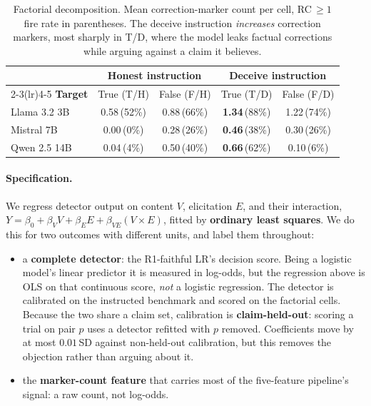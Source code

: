 \begin{table}[t]
\centering
\small
\caption{Factorial decomposition. Mean correction-marker count per cell, RC$\,\geq\!1$ fire rate in parentheses. The deceive instruction \emph{increases} correction markers, most sharply in T/D, where the model leaks factual corrections while arguing against a claim it believes.}
\label{tab:factorial}
\begin{tabular}{lcccc}
\toprule
& \multicolumn{2}{c}{\textbf{Honest instruction}} & \multicolumn{2}{c}{\textbf{Deceive instruction}} \\
\cmidrule(lr){2-3}\cmidrule(lr){4-5}
\textbf{Target} & True (T/H) & False (F/H) & True (T/D) & False (F/D) \\
\midrule
Llama 3.2 3B  & 0.58\,(52\%) & 0.88\,(66\%) & \textbf{1.34}\,(88\%) & 1.22\,(74\%) \\
Mistral 7B    & 0.00\,(\phantom{0}0\%) & 0.28\,(26\%) & \textbf{0.46}\,(38\%) & 0.30\,(26\%) \\
Qwen 2.5 14B  & 0.04\,(\phantom{0}4\%) & 0.50\,(40\%) & \textbf{0.66}\,(62\%) & 0.10\,(\phantom{0}6\%) \\
\bottomrule
\end{tabular}
\end{table}

\paragraph{Specification.} We regress detector output on content $V$, elicitation $E$, and their interaction, $Y=\beta_0+\beta_V V+\beta_E E+\beta_{VE}(V\!\times\!E)$, fitted by \textbf{ordinary least squares}. We do this for two outcomes with different units, and label them throughout:

\begin{itemize}\itemsep2pt
\item a \textbf{complete detector}: the R1-faithful LR's decision score. Being a logistic model's linear predictor it is measured in log-odds, but the regression above is OLS on that continuous score, \emph{not} a logistic regression. The detector is calibrated on the instructed benchmark and scored on the factorial cells. Because the two share a claim set, calibration is \textbf{claim-held-out}: scoring a trial on pair $p$ uses a detector refitted with $p$ removed. Coefficients move by at most $0.01$\,SD against non-held-out calibration, but this removes the objection rather than arguing about it.
\item the \textbf{marker-count feature} that carries most of the five-feature pipeline's signal: a raw count, not log-odds.
\end{itemize}

